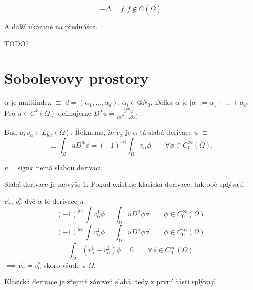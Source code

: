 \documentclass[12pt]{article}					%
\begin{document}
\begin{poznamka}
	$$ - \Delta = f, f \notin C(\overline{\Omega}) $$

	A další ukázané na přednášce.
\end{poznamka}

TODO?


\section{Sobolevovy prostory}
\begin{definice}[Multiindex]
	$\alpha$ je multiindex $≡$ $d = (\alpha_1, …, \alpha_d)$, $\alpha_i \in ®N_0$. Délka $\alpha$ je $|\alpha| := \alpha_1 + … + \alpha_d$. Pro $u \in C^k(\Omega)$ definujeme $D^\alpha u = \frac{\partial^{|d|} u}{\partial x_1^{\alpha_1} … \partial x_d^{\alpha_d}}$.
\end{definice}

\begin{definice}
	Buď $u, v_\alpha \in L^1_{loc}(\Omega)$. Řekneme, že $v_\alpha$ je $\alpha$-tá slabá derivace $u$ $≡$
	$$ ≡ \int_\Omega u D^\alpha \phi = (-1)^{|\alpha|} \int_\Omega v_\alpha \phi \qquad \forall \phi \in C_0^∞(\Omega). $$
\end{definice}

\begin{priklad}
	$u = \mathrm{sign} x$ nemá slabou derivaci.
\end{priklad}

\begin{lemma}[O smysluplnosti]
	Slabá derivace je nejvýše 1. Pokud existuje klasická derivace, tak obě splývají.

	\begin{dukazin}
		$v_\alpha^1$, $v_\alpha^2$ dvě $\alpha$-té derivace $u$.
		$$ (-1)^{|\alpha|} \int v_\alpha^1 \phi = \int_\Omega u D^\alpha \phi \forall \qquad \phi \in C_0^∞(\Omega) $$
		$$ (-1)^{|\alpha|} \int v_\alpha^2 \phi = \int_\Omega u D^\alpha \phi \forall \qquad \phi \in C_0^∞(\Omega) $$
		$$ \int_\Omega (v_\alpha^1 - v_\alpha^2) \phi = 0 \qquad \forall \phi \in C_0^∞(\Omega) $$
		$\implies v_\alpha^1 = v_\alpha^2$ skoro všude v $\Omega$.

		Klasická derivace je zřejmě zároveň slabá, tedy z první části splývají.
	\end{dukazin}
\end{lemma}
\end{document}
